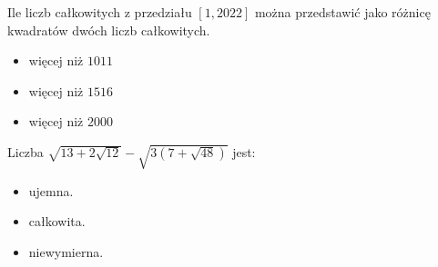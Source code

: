 \documentclass[12pt, a4paper]{article}
\newcommand{\question}[1]{\normalitem \begin{samepage}#1 \end{samepage}}
\newcommand{\questionwithasterix}[1]{ \asterixitem \begin{samepage}#1 \vspace{6cm}\end{samepage}}
\newcommand{\cmark}{\textcolor{green}{T}}%
\newcommand{\xmark}{\textcolor{red}{N}}%
\newcommand{\yes}{\rlap{\framebox(15,15)} {\raisebox{2pt}{\large\hspace{-1pt}\cmark}}%
\hspace{3pt}}
\newcommand{\no}{\rlap{\framebox(15,15)} {\raisebox{2pt}{\large\hspace{-1pt}\xmark}}%
\hspace{3pt}}
\begin{document}
\begin{enumerate}
	\question {
		Ile liczb całkowitych z przedziału $[1,2022]$ można przedstawić jako różnicę kwadratów dwóch liczb całkowitych. 
		
		\begin{itemize}
			\item [\yes]więcej niż $1011$
			\item [\no]więcej niż $1516$
			\item [\no]więcej niż $2000$
		\end{itemize}
	}
	
	\questionwithasterix {
		Liczba $\sqrt{13+2 \sqrt{12}}-\sqrt{3(7+\sqrt{48})}$ jest:
		
		\begin{itemize}
			\item [\yes]ujemna.
			\item [\yes]całkowita.
			\item [\no]niewymierna.
		\end{itemize}
	}
	
\end{enumerate}
\end{document}
